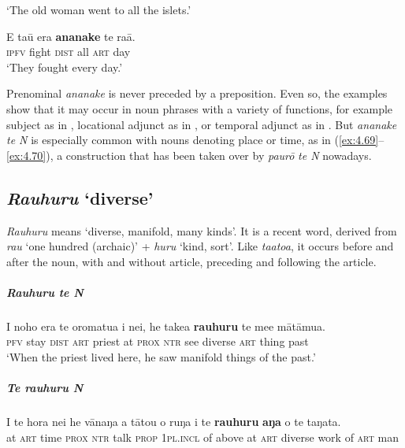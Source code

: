 \glt 
‘The old woman went to all the islets.’ \textstyleExampleref{[Mtx-3-06.045]}
\z

\ea\label{ex:4.70}
\gll E taū era \textbf{ananake} te ra{\ꞌ}ā. \\
\textsc{ipfv} fight \textsc{dist} all \textsc{art} day \\

\glt
‘They fought every day.’ \textstyleExampleref{[Mtx-3-05.006]}
\z

Prenominal \textit{ananake} is never preceded by a preposition. Even so, the examples show that it may occur in noun phrases with a variety of functions, for example subject as in , locational adjunct as in , or temporal adjunct as in . But \textit{ananake} \textit{te N} is especially common with nouns denoting place or time, as in (\ref{ex:4.69}–\ref{ex:4.70}), a construction that has been taken over by \textit{paurō} \textit{te N} nowadays. 

\subsection{\textit{Rauhuru} ‘diverse’}\label{sec:4.4.5}
\textit{Rauhuru} means ‘diverse, manifold, many kinds’. It is a recent word, derived from \textit{rau} ‘one hundred (archaic)’ + \textit{huru} ‘kind, sort’. Like \textit{ta{\ꞌ}ato{\ꞌ}a}, it occurs before and after the noun, with and without article, preceding and following the article.

\subparagraph{\textit{Rauhuru te N}}

\ea\label{ex:4.71}
\gll I noho era te oromatu{\ꞌ}a {\ꞌ}i nei, he take{\ꞌ}a \textbf{rauhuru} te me{\ꞌ}e mātāmu{\ꞌ}a. \\
\textsc{pfv} stay \textsc{dist} \textsc{art} priest at \textsc{prox} \textsc{ntr} see diverse \textsc{art} thing past \\

\glt 
‘When the priest lived here, he saw manifold things of the past.’ \textstyleExampleref{[R423.021]} 
\z

\subparagraph{\textit{Te rauhuru N}}

\ea\label{ex:4.72}
\gll {\ꞌ}I te hora nei he vānaŋa a tātou o ruŋa i te \textbf{rauhuru} \textbf{aŋa}  o te taŋata.\\
at \textsc{art} time \textsc{prox} \textsc{ntr} talk \textsc{prop} \textsc{1pl.incl} of above at \textsc{art} diverse work  of \textsc{art} man\\

